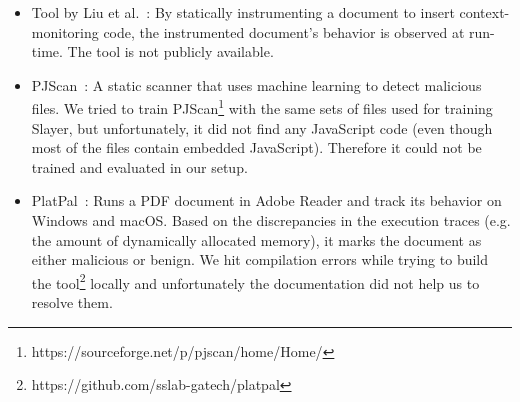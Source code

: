 \begin{itemize}
    \item Tool by Liu et al.~\cite{liu2014detecting}: By statically instrumenting a document to insert context-monitoring code, the instrumented document's behavior is observed at run-time. The tool is not publicly available.
    \item PJScan~\cite{laskov2011static}: A static scanner that uses machine learning to detect malicious files. We tried to train PJScan\footnote{https://sourceforge.net/p/pjscan/home/Home/} with the same sets of files used for training Slayer, but unfortunately, it did not find any JavaScript code (even though most of the files contain embedded JavaScript). Therefore it could not be trained and evaluated in our setup.
    \item PlatPal~\cite{xu2017platpal}: Runs a PDF document in Adobe Reader and track its behavior on Windows and macOS. Based on the discrepancies in the execution traces (e.g. the amount of dynamically allocated memory), it marks the document as either malicious or benign. We hit compilation errors while trying to build the tool\footnote{https://github.com/sslab-gatech/platpal} locally and unfortunately the documentation did not help us to resolve them.
\end{itemize}
